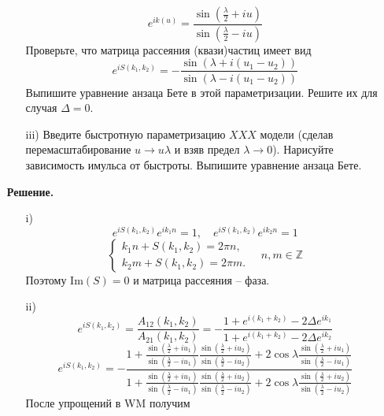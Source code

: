 \documentclass[12pt]{article}
\theoremstyle{definition}
\begin{document}
\begin{enumerate}
\begin{itemize}
\begin{equation}
            e^{ik(u)}=\frac{\sin(\frac{\lambda}{2}+iu)}{\sin(\frac{\lambda}{2}-iu)}
        \end{equation}
        Проверьте, что матрица рассеяния (квази)частиц имеет вид
        \begin{equation}
            e^{iS(k_1,k_2)}=-\frac{\sin(\lambda+i(u_1-u_2))}{\sin(\lambda-i(u_1-u_2))}
        \end{equation}
        Выпишите уравнение анзаца Бете в этой параметризации. Решите их для случая $\Delta=0$.
        \item[iii)] Введите быстротную параметризацию $XXX$ модели (сделав перемасштабирование $u\rightarrow u\lambda$ и взяв предел $\lambda\rightarrow0$). Нарисуйте зависимость имульса от быстроты. Выпишите уравнение анзаца Бете.
    \end{itemize}
    \textbf{Решение.}
    \begin{itemize}
        \item[i)] 
        \begin{equation}
            e^{iS(k_1,k_2)}e^{ik_1n}=1,\quad e^{iS(k_1,k_2)}e^{ik_2n}=1
        \end{equation}
        \begin{equation}
            \begin{cases}
                k_1n+S(k_1,k_2)=2\pi n,\\
                k_2m+S(k_1,k_2)=2\pi m.
            \end{cases}\quad n,m\in\mathbb{Z}
        \end{equation}
        Поэтому $\text{Im}(S)=0$ и матрица рассеяния -- фаза.
        \item[ii)]
        \begin{equation}
            e^{iS(k_1,k_2)}=\frac{A_{12}(k_1,k_2)}{A_{21}(k_1,k_2)}=-\frac{1+e^{i(k_1+k_2)}-2\Delta e^{ik_1}}{1+e^{i(k_1+k_2)}-2\Delta e^{ik_2}}
        \end{equation}
        \begin{equation}
            e^{iS(k_1,k_2)}=-\frac{1+\frac{\sin(\frac{\lambda}{2}+iu_1)}{\sin(\frac{\lambda}{2}-iu_1)}\frac{\sin(\frac{\lambda}{2}+iu_2)}{\sin(\frac{\lambda}{2}-iu_2)}+2\cos\lambda\frac{\sin(\frac{\lambda}{2}+iu_1)}{\sin(\frac{\lambda}{2}-iu_1)}}{1+\frac{\sin(\frac{\lambda}{2}+iu_1)}{\sin(\frac{\lambda}{2}-iu_1)}\frac{\sin(\frac{\lambda}{2}+iu_2)}{\sin(\frac{\lambda}{2}-iu_2)}+2\cos\lambda\frac{\sin(\frac{\lambda}{2}+iu_2)}{\sin(\frac{\lambda}{2}-iu_2)}}
        \end{equation}
        После упрощений в WM получим

\end{itemize}
\end{enumerate}
\end{document}
